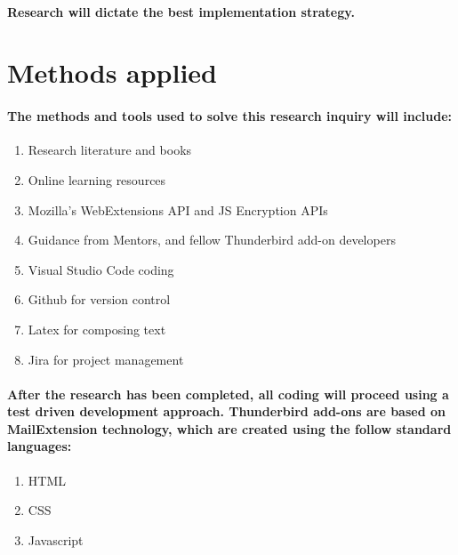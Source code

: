 \paragraph{Research will dictate the best implementation strategy.}

\section{Methods applied}




\paragraph{The methods and tools used to solve this research inquiry will include:}

\begin{enumerate}
\item Research literature and books
\item Online learning resources
\item Mozilla's WebExtensions API and JS Encryption APIs
\item Guidance from Mentors, and fellow Thunderbird add-on developers
\item Visual Studio Code coding
\item Github for version control
\item Latex for composing text
\item Jira for project management
\end{enumerate}

\paragraph{After the research has been completed, all coding will proceed using a test driven development approach. Thunderbird add-ons are based on MailExtension technology, which are created using the follow standard languages:}

\begin{enumerate}
\item HTML
\item CSS
\item Javascript
\end{enumerate}







